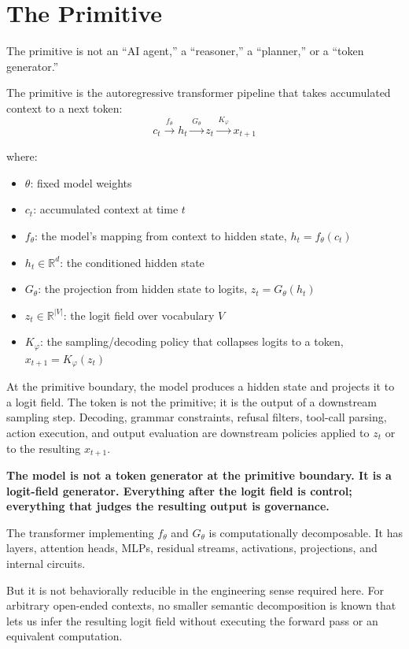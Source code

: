\documentclass[11pt]{article}
\begin{document}
\section{The Primitive}

The primitive is not an ``AI agent,'' a ``reasoner,'' a ``planner,'' or a ``token generator.''

The primitive is the autoregressive transformer pipeline that takes accumulated context to a next token:
\[
c_t \xrightarrow{\,f_\theta\,} h_t \xrightarrow{\,G_\theta\,} z_t \xrightarrow{\,K_\varphi\,} x_{t+1}
\]

where:
\begin{itemize}
\item $\theta$: fixed model weights
\item $c_t$: accumulated context at time $t$
\item $f_\theta$: the model's mapping from context to hidden state, $h_t = f_\theta(c_t)$
\item $h_t \in \mathbb{R}^d$: the conditioned hidden state
\item $G_\theta$: the projection from hidden state to logits, $z_t = G_\theta(h_t)$
\item $z_t \in \mathbb{R}^{|V|}$: the logit field over vocabulary $V$
\item $K_\varphi$: the sampling/decoding policy that collapses logits to a token, $x_{t+1} = K_\varphi(z_t)$
\end{itemize}

At the primitive boundary, the model produces a hidden state and projects it to a logit field. The token is not the primitive; it is the output of a downstream sampling step. Decoding, grammar constraints, refusal filters, tool-call parsing, action execution, and output evaluation are downstream policies applied to $z_t$ or to the resulting $x_{t+1}$.

\begin{pullquote}
\textbf{The model is not a token generator at the primitive boundary. It is a logit-field generator. Everything after the logit field is control; everything that judges the resulting output is governance.}
\end{pullquote}

The transformer implementing $f_\theta$ and $G_\theta$ is computationally decomposable. It has layers, attention heads, MLPs, residual streams, activations, projections, and internal circuits.

But it is not behaviorally reducible in the engineering sense required here. For arbitrary open-ended contexts, no smaller semantic decomposition is known that lets us infer the resulting logit field without executing the forward pass or an equivalent computation.
\end{document}
